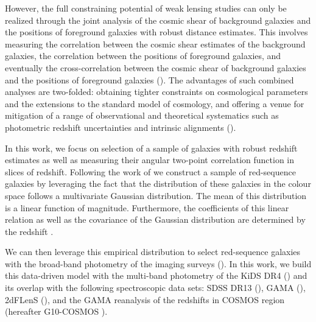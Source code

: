 \documentclass[fleqn,usenatbib,useAMS]{mnras}
\begin{document}
However, the full constraining potential of weak lensing studies can only be realized through the joint analysis of the cosmic shear of background galaxies and the positions of foreground galaxies with robust distance estimates. This involves measuring the correlation between the cosmic shear estimates of the background galaxies, the correlation between the positions of foreground galaxies, and eventually the cross-correlation between the cosmic shear of background galaxies and the positions of foreground galaxies (\citealt{cacciato2013, cosmolike, des_y1_cosmology, elvin2017, edo2018, prat2017}). 
The advantages of such combined analyses are two-folded: obtaining tighter constraints on cosmological parameters and the extensions to the standard model of cosmology, and offering a venue for mitigation of a range of observational and theoretical systematics such as photometric redshift uncertainties and intrinsic alignments (\citealt{edo2016, joudaki2018, sam2019}). 

In this work, we focus on selection of a sample of galaxies with robust redshift estimates as well as measuring their angular two-point correlation function in slices of redshift. Following the work of \citet{vakili2019} we construct a sample of red-sequence galaxies by leveraging the fact that the distribution of these galaxies in the colour space follows a multivariate Gaussian distribution. The mean of this distribution is a linear function of magnitude. Furthermore, the coefficients of this linear relation as well as the covariance of the Gaussian distribution are determined by the redshift \citep[e.g.][]{bower1992,ellis1997,gladders1998,stanford1998}. 

We can then leverage this empirical distribution to select red-sequence galaxies with the broad-band photometry of the imaging surveys (\citealt{gladders_yee2000,hao2009,redmap_sdss,rozo2016,elvin2017,oguri2018,vakili2019}). In this work, we build this data-driven model with the multi-band photometry of the KiDS DR4 (\citealt{kuijken2019}) and its overlap with the following spectroscopic data sets: SDSS DR13 (\citealt{sdss_dr13}), GAMA (\citealt{driver2011}), 2dFLenS (\citealt{blake2016}), and the GAMA reanalysis of the redshifts in COSMOS region (hereafter G10-COSMOS \citealt{davis2015}). 

\end{document}
